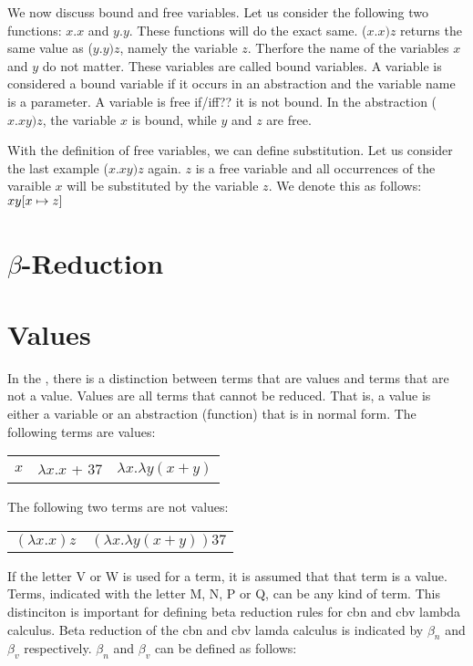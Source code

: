 We now discuss bound and free variables. Let us consider the following two functions: \la$x. x$ and \la$y. y$. These functions will do the exact same.
(\la$x. x) z$ returns the same value as (\la$y.y) z$, namely the variable $z$. Therfore the name of the variables $x$ and $y$ do not matter. These variables are called bound variables.
A variable is considered a bound variable if it occurs in an abstraction and the variable name is a parameter. A variable is free if/iff?? it is not bound.
In the abstraction (\la$x. xy) z$, the variable $x$ is bound, while $y$ and $z$ are free.

With the definition of free variables, we can define substitution. Let us consider the last example (\la$x. xy) z$ again. $z$ is a free variable and all occurrences of the varaible $x$ will be substituted by the variable $z$.
We denote this as follows: $xy [{x}\mapsto{z}]$

\section{\texorpdfstring{\boldmath${\beta}$-Reduction}{Beta Reduction}}

\section{Values}
In the \lc, there is a distinction between terms that are values and terms that are not a value.
Values are all terms that cannot be reduced. That is, a value is either a variable or an abstraction (function) that is in normal form.
The following terms are values:

\vspace{10pt}
\begin{tabular}{c c c}
	$x$ & \quad $\lambda x. x$ + 37 & \quad $\lambda x.\lambda y (x + y)$
\end{tabular}

\vspace{10pt}
The following two terms are not values:

\vspace{10pt}
\begin{tabular}{c c}
	$(\lambda x. x) z$ & \quad $(\lambda x.\lambda y (x + y))37$
\end{tabular}

\vspace{10pt}
If the letter V or W is used for a term, it is assumed that that term is a value.
Terms, indicated with the letter M, N, P or Q, can be any kind of term.
This distinciton is important for defining beta reduction rules for cbn and cbv lambda calculus.
Beta reduction of the cbn and cbv lamda calculus is indicated by $\beta_n$ and $\beta_v$ respectively.
$\beta_n$ and $\beta_v$ can be defined as follows:

